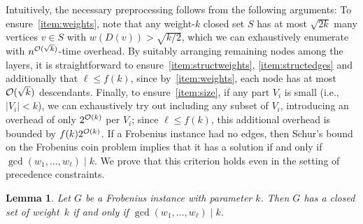 \documentclass[10pt,a4paper]{article}
\newtheorem{lem}[thm]{Lemma}
\newcommand{\Oh}{{\cal O}}
\newcommand{\divides}{\mid}
\begin{document}
%
Intuitively, the necessary preprocessing follows from the following arguments: To ensure~\ref{item:weights}, note that any weight-$k$ closed set $S$ has at most $\sqrt{2k}$ many vertices $v\in S$ with $w(D(v)) > \sqrt{k/2}$, which we can exhaustively enumerate with $n^{\Oh(\sqrt{k})}$-time overhead. By suitably arranging remaining nodes among the layers, it is straightforward to ensure~\ref{item:structweights}, \ref{item:structedges} and additionally that $\ell \le f(k)$, since by~\ref{item:weights}, each node has at most $\Oh(\sqrt{k})$ descendants. Finally, to ensure~\ref{item:size}, if any part $V_i$ is small (i.e., $|V_i| < k$), we can exhaustively try out including any subset of $V_i$, introducing an overhead of only $2^{\Oh(k)}$ per $V_i$; since $\ell \le f(k)$, this additional overhead is bounded by $f(k)2^{\Oh(k)}$.  
%
%
%
%
%
If a Frobenius instance had no edges, then Schur's bound on the Frobenius coin problem implies that it has a solution if and only if $\gcd(w_1,\dots, w_\ell) \divides k$. We prove that this criterion holds even in the setting of precedence constraints.  
%
\begin{lem}\label{lem:Frobcrit}
Let $G$ be a Frobenius instance with  parameter $k$. Then $G$ has a closed set of weight~$k$ if and only if $\gcd(w_1,\dots, w_\ell) \divides k$.
\end{lem}
\end{document}
